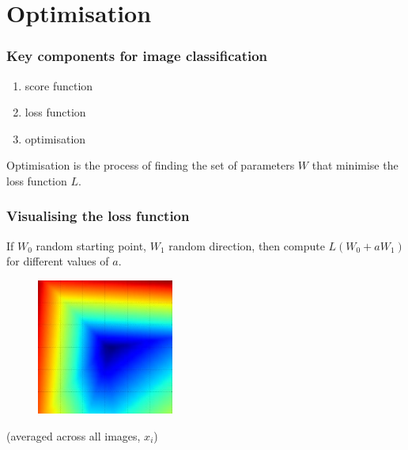
\section{Optimisation}

\begin{frame}
	\frametitle{Key components for image classification}

	\begin{enumerate}
		\item score function
		\item loss function
		\item optimisation
	\end{enumerate}

	Optimisation is the process of finding the set of parameters $W$ that 
	minimise the loss function $L$.

\end{frame}

\begin{frame}
	\frametitle{Visualising the loss function}

	If $W_0$ random starting point, $W_1$ random direction, then compute 
	$L(W_0 + a W_1)$ for different values of $a$.

	\centering
        \begin{figure}
                \includegraphics[width=0.4\textwidth]{Pics/svm_one.jpg}
        \end{figure}
	
	\small{(averaged across all images, $x_i$)}

\end{frame}

